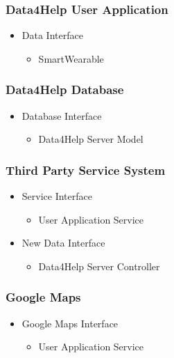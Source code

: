 \documentclass[../../DD.tex]{subfiles}
\begin{document}
		\subsubsection{Data4Help User Application}
		\begin{itemize}
			\item Data Interface
			\begin{itemize}
				\item SmartWearable
			\end{itemize}
		\end{itemize}
		
		\subsubsection{Data4Help Database}
		\begin{itemize}
			\item Database Interface
			\begin{itemize}
				\item Data4Help Server Model
			\end{itemize}
		\end{itemize}

		\subsubsection{Third Party Service System}
		\begin{itemize}
			\item Service Interface
			\begin{itemize}
				\item User Application Service
			\end{itemize}
			\item New Data Interface
			\begin{itemize}
				\item Data4Help Server Controller
			\end{itemize}
		\end{itemize}

		\subsubsection{Google Maps}
		\begin{itemize}
			\item Google Maps Interface 
			\begin{itemize}
				\item User Application Service
			\end{itemize}
		\end{itemize}
\end{document}
